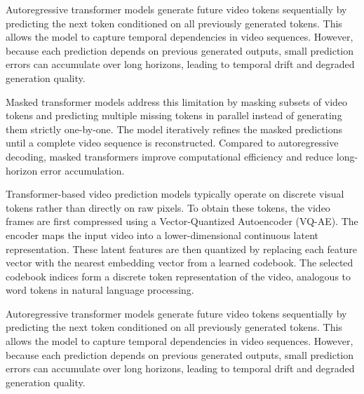 Autoregressive transformer models generate future video tokens sequentially by predicting the next token conditioned on all previously generated tokens. This allows the model to capture temporal dependencies in video sequences. However, because each prediction depends on previous generated outputs, small prediction errors can accumulate over long horizons, leading to temporal drift and degraded generation quality.

Masked transformer models address this limitation by masking subsets of video tokens and predicting multiple missing tokens in parallel instead of generating them strictly one-by-one. The model iteratively refines the masked predictions until a complete video sequence is reconstructed. Compared to autoregressive decoding, masked transformers improve computational efficiency and reduce long-horizon error accumulation.


Transformer-based video prediction models typically operate on discrete visual tokens rather than directly on raw pixels. To obtain these tokens, the video frames are first compressed using a Vector-Quantized Autoencoder (VQ-AE). The encoder maps the input video into a lower-dimensional continuous latent representation. These latent features are then quantized by replacing each feature vector with the nearest embedding vector from a learned codebook. The selected codebook indices form a discrete token representation of the video, analogous to word tokens in natural language processing.

Autoregressive transformer models generate future video tokens sequentially by predicting the next token conditioned on all previously generated tokens.
 This allows the model to capture temporal dependencies in video sequences. However, because each prediction depends on previous generated outputs, small prediction errors can accumulate over long horizons, leading to temporal drift and degraded generation quality.

